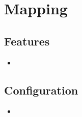\section{Mapping}
\label{module:Mapping}
\ClearAPI
\TODO
\subsection{Features}
\begin{itemize}
	\item \TODO
\end{itemize}

\subsection{Configuration}
\begin{itemize}
	\item {}
\end{itemize}
